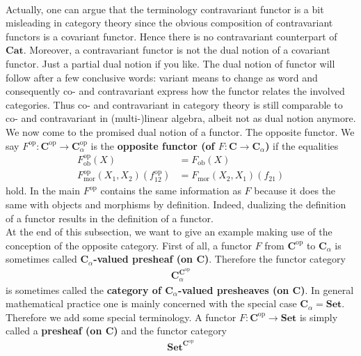 \\
Actually, one can argue that the terminology {\glqq}contravariant functor{\grqq} is a bit misleading in category theory since the obvious composition of contravariant functors is a covariant functor. Hence there is no contravariant counterpart of $\mathbf{Cat}$. Moreover, a contravariant functor is not the dual notion of a covariant functor. Just a partial dual notion if you like. The dual notion of functor will follow after a few conclusive words: {\glqq}variant{\grqq} means {\glqq}to change{\grqq} as word and consequently co- and contravariant express how the functor relates the involved categories. Thus co- and contravariant in category theory is still comparable to co- and contravariant in (multi-)linear algebra, albeit not as dual notion anymore. We now come to the promised dual notion of a functor. The opposite functor. We say $F^{\mathrm{op}} \colon \mathbf{C}^{\mathrm{op}} \rightarrow \mathbf{C}_{\alpha}^{\mathrm{op}}$ is the \textbf{opposite functor (of $F \colon \mathbf{C} \rightarrow \mathbf{C}_{\alpha}$)} if the equalities
\begin{align*}
  F_{\mathrm{ob}}^{\mathrm{op}}(X)
  &=
  F_{\mathrm{ob}}(X)
  \\
  F_{\mathrm{mor}}^{\mathrm{op}}(X_{1},X_{2})(f_{12}^{\mathrm{op}})
  &=
  F_{\mathrm{mor}}(X_{2},X_{1})(f_{21})
\end{align*}
hold. In the main $F^{\mathrm{op}}$ contains the same information as $F$ because it does the same with objects and morphisms by definition. Indeed, dualizing the definition of a functor results in the definition of a functor.
\\
At the end of this subsection, we want to give an example making use of the conception of the opposite category. First of all, a functor $F$ from $\mathbf{C}^{\mathrm{op}}$ to $\mathbf{C}_{\alpha}$ is sometimes called \textbf{$\mathbf{C}_{\alpha}$-valued presheaf (on $\mathbf{C}$)}. Therefore the functor category
\begin{align*}
  \mathbf{C}_{\alpha}^{\mathbf{C}^{\mathrm{op}}}
\end{align*}
is sometimes called the \textbf{category of $\mathbf{C}_{\alpha}$-valued presheaves (on $\mathbf{C}$)}. In general mathematical practice one is mainly concerned with the special case $\mathbf{C}_{\alpha} = \mathbf{Set}$. Therefore we add some special terminology. A functor $F \colon \mathbf{C}^{\mathrm{op}} \rightarrow \mathbf{Set}$ is simply called a \textbf{presheaf (on $\mathbf{C}$)} and the functor category
\begin{align*}
  \mathbf{Set}^{\mathbf{C}^{\mathrm{op}}}
\end{align*}

